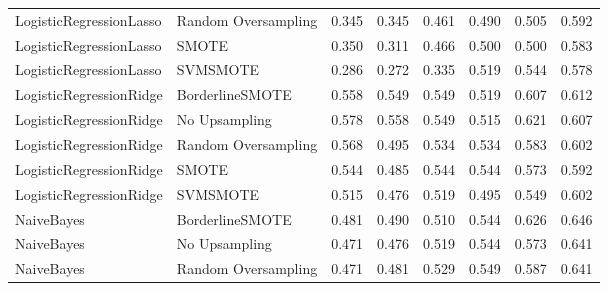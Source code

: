 \begin{tabular}{llllllll}
     LogisticRegressionLasso & Random Oversampling &     0.345 &                     0.345 &                 0.461 &                  0.490 &                                   0.505 &     0.592 \\
     LogisticRegressionLasso &               SMOTE &     0.350 &                     0.311 &                 0.466 &                  0.500 &                                   0.500 &     0.583 \\
     LogisticRegressionLasso &            SVMSMOTE &     0.286 &                     0.272 &                 0.335 &                  0.519 &                                   0.544 &     0.578 \\
     LogisticRegressionRidge &     BorderlineSMOTE &     0.558 &                     0.549 &                 0.549 &                  0.519 &                                   0.607 &     0.612 \\
     LogisticRegressionRidge &       No Upsampling &     0.578 &                     0.558 &                 0.549 &                  0.515 &                                   0.621 &     0.607 \\
     LogisticRegressionRidge & Random Oversampling &     0.568 &                     0.495 &                 0.534 &                  0.534 &                                   0.583 &     0.602 \\
     LogisticRegressionRidge &               SMOTE &     0.544 &                     0.485 &                 0.544 &                  0.544 &                                   0.573 &     0.592 \\
     LogisticRegressionRidge &            SVMSMOTE &     0.515 &                     0.476 &                 0.519 &                  0.495 &                                   0.549 &     0.602 \\
                  NaiveBayes &     BorderlineSMOTE &     0.481 &                     0.490 &                 0.510 &                  0.544 &                                   0.626 &     0.646 \\
                  NaiveBayes &       No Upsampling &     0.471 &                     0.476 &                 0.519 &                  0.544 &                                   0.573 &     0.641 \\
                  NaiveBayes & Random Oversampling &     0.471 &                     0.481 &                 0.529 &                  0.549 &                                   0.587 &     0.641 \\

\end{tabular}
